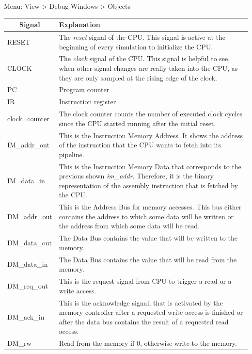 Menu: View \textgreater{} Debug Windows \textgreater{} Objects
\begin{table}[!htb]
	\centering
	\begin{tabular}{|p{4cm}|p{13cm}|}
		\hline
		\multicolumn{1}{|c|}{\textbf{Signal}} & \textbf{Explanation}                                                               \\ \hline
		RESET & The \emph{reset} signal of the CPU. This signal is active at the
		beginning of every simulation to initialize the CPU.\\\hline
		CLOCK & The \emph{clock} signal of the CPU. This signal is helpful to
		see, when other signal changes are really taken into the CPU, as they
		are only sampled at the rising edge of the clock.\\\hline
		PC & Program counter\\\hline
		IR & Instruction register\\\hline
		clock\_counter & The clock counter counts the number of executed clock
		cycles since the CPU started running after the initial
		reset.\\\hline
		IM\_addr\_out & This is the Instruction Memory Address. It shows the
		address of the instruction that the CPU wants to fetch into its
		pipeline.\\\hline
		IM\_data\_in & This is the Instruction Memory Data that corresponds to
		the previous shown \emph{im\_addr}. Therefore, it is the binary
		representation of the assembly instruction that is fetched by the
		CPU.\\\hline
		DM\_addr\_out & This is the Address Bus for memory accesses. This bus
		either contains the address to which some data will be written or the
		address from which some data will be read.\\\hline
		DM\_data\_out & The Data Bus contains the value that will be written to
		the memory.\\\hline
		DM\_data\_in & The Data Bus contains the value that will be read from
		the memory.\\\hline
		DM\_req\_out & This is the request signal from CPU to trigger a read or
		a write access.\\\hline
		DM\_ack\_in & This is the acknowledge signal, that is activated by the
		memory controller after a requested write access is finished or after
		the data bus contains the result of a requested read
		access.\\\hline
		DM\_rw & Read from the memory if 0, otherwise write to the
		memory.\\\hline

\end{tabular}
\end{table}
